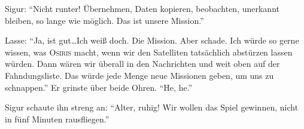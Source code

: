 Sigur: \enquote{Nicht runter! Übernehmen, Daten kopieren, beobachten, unerkannt bleiben, so lange wie möglich.
Das ist unsere Mission.}

Lasse: \enquote{Ja, ist gut\dots Ich weiß doch.
Die Mission.
Aber schade.
Ich würde so gerne wissen, was \textsc{Osiris} macht, wenn wir den Satelliten tatsächlich abstürzen lassen würden.
Dann wären wir überall in den Nachrichten und weit oben auf der Fahndungsliste.
Das würde jede Menge neue Missionen geben, um uns zu schnappen.} Er grinste über beide Ohren. \enquote{He, he.}

Sigur schaute ihn streng an: \enquote{Alter, ruhig! Wir wollen das Spiel gewinnen, nicht in fünf Minuten rausfliegen.}

